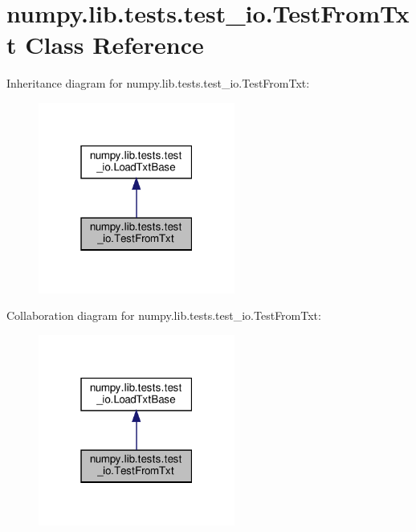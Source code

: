 \hypertarget{classnumpy_1_1lib_1_1tests_1_1test__io_1_1TestFromTxt}{}\section{numpy.\+lib.\+tests.\+test\+\_\+io.\+Test\+From\+Txt Class Reference}
\label{classnumpy_1_1lib_1_1tests_1_1test__io_1_1TestFromTxt}


Inheritance diagram for numpy.\+lib.\+tests.\+test\+\_\+io.\+Test\+From\+Txt\+:
\nopagebreak
\begin{figure}[H]
\begin{center}
\leavevmode
\includegraphics[width=183pt]{classnumpy_1_1lib_1_1tests_1_1test__io_1_1TestFromTxt__inherit__graph}
\end{center}
\end{figure}


Collaboration diagram for numpy.\+lib.\+tests.\+test\+\_\+io.\+Test\+From\+Txt\+:
\nopagebreak
\begin{figure}[H]
\begin{center}
\leavevmode
\includegraphics[width=183pt]{classnumpy_1_1lib_1_1tests_1_1test__io_1_1TestFromTxt__coll__graph}
\end{center}
\end{figure}
